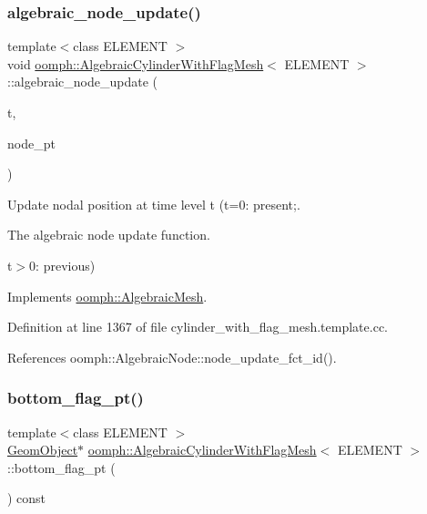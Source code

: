 \subsubsection{\texorpdfstring{algebraic\+\_\+node\+\_\+update()}{algebraic\_node\_update()}}
{\footnotesize\ttfamily template$<$class E\+L\+E\+M\+E\+NT $>$ \\
void \hyperlink{classoomph_1_1AlgebraicCylinderWithFlagMesh}{oomph\+::\+Algebraic\+Cylinder\+With\+Flag\+Mesh}$<$ E\+L\+E\+M\+E\+NT $>$\+::algebraic\+\_\+node\+\_\+update (\begin{DoxyParamCaption}\item[{const unsigned \&}]{t,  }\item[{\hyperlink{classoomph_1_1AlgebraicNode}{Algebraic\+Node} $\ast$\&}]{node\+\_\+pt }\end{DoxyParamCaption})\hspace{0.3cm}{\ttfamily [virtual]}}



Update nodal position at time level t (t=0\+: present;. 

The algebraic node update function.

t$>$0\+: previous) 

Implements \hyperlink{classoomph_1_1AlgebraicMesh_ab01d6f93354f3c4e5c9d1f0a5885a65b}{oomph\+::\+Algebraic\+Mesh}.



Definition at line 1367 of file cylinder\+\_\+with\+\_\+flag\+\_\+mesh.\+template.\+cc.



References oomph\+::\+Algebraic\+Node\+::node\+\_\+update\+\_\+fct\+\_\+id().

\mbox{\label{classoomph_1_1AlgebraicCylinderWithFlagMesh_a9c362fcc5edeb1b6e773f27a83778495}} 
\subsubsection{\texorpdfstring{bottom\+\_\+flag\+\_\+pt()}{bottom\_flag\_pt()}}
{\footnotesize\ttfamily template$<$class E\+L\+E\+M\+E\+NT $>$ \\
\hyperlink{classoomph_1_1GeomObject}{Geom\+Object}$\ast$ \hyperlink{classoomph_1_1AlgebraicCylinderWithFlagMesh}{oomph\+::\+Algebraic\+Cylinder\+With\+Flag\+Mesh}$<$ E\+L\+E\+M\+E\+NT $>$\+::bottom\+\_\+flag\+\_\+pt (\begin{DoxyParamCaption}{ }\end{DoxyParamCaption}) const\hspace{0.3cm}{\ttfamily [inline]}}



